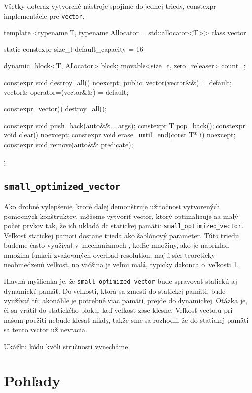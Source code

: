 Všetky doteraz vytvorené nástroje spojíme do jednej triedy, constexpr implementácie pre \texttt{vector}.
\begin{code}[fontsize=\footnotesize]
template <typename T, typename Allocator = std::allocator<T>>
class vector
{   static constexpr size_t default_capacity = 16;

    dynamic_block<T, Allocator> block;
    movable<size_t, zero_releaser> count_;
    
    constexpr void destroy_all() noexcept;
public:
    vector(vector&&) = default;
    vector& operator=(vector&&) = default;
    
    constexpr ~vector() { destroy_all(); }
    
    constexpr void push_back(auto&&... args);
    constexpr T pop_back();
    constexpr void clear() noexcept;
    constexpr void erase_until_end(const T* i) noexcept;
    constexpr void remove(auto&& predicate); };
\end{code}

\subsection{\texttt{small\_optimized\_vector}}

Ako drobné vylepšenie, ktoré ďalej demonštruje užitočnosť vytvorených pomocných konštruktov, môžeme vytvoriť vector, ktorý optimalizuje na malý počet prvkov tak, že ich ukladá do statickej pamäti: \texttt{small\_optimized\_vector}. Veľkosť statickej pamäti dostane trieda ako šablónový parameter. Túto triedu budeme často využívať v~mechanizmoch \PPreflection, keďže množiny, ako je napríklad množina funkcií zvažovaných overload resolution, majú síce teoreticky neobmedzenú veľkosť, no väčšina je veľmi malá, typicky dokonca o~veľkosti 1.

Hlavná myšlienka je, že \texttt{small\_optimized\_vector} bude spravovať statickú aj dynamickú pamäť. Do veľkosti, ktorá sa zmestí do statickej pamäti, bude využívať tú; akonáhle je potrebné viac pamäti, prejde do dynamickej. Otázka je, či sa vrátiť do statického bloku, keď veľkosť zase klesne. Veľkosť vectoru pri našom použití nebude klesať nikdy, takže sme sa rozhodli, že do statickej pamäti sa tento vector už nevracia.

Ukážku kódu kvôli stručnosti vynecháme.

\section{Pohľady}

